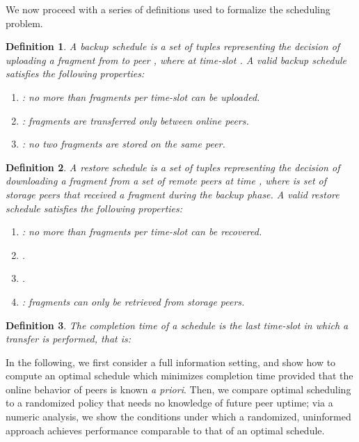 \documentclass[conference,10pt]{IEEEtran}
\newtheorem{definition}{Definition}
\begin{document}
We now proceed with a series of definitions used to formalize the
scheduling problem.

\begin{definition}
	A \emph{backup schedule} is a set of  tuples representing the decision of uploading a fragment from  to peer , where  at time-slot . A valid backup schedule  satisfies the following properties: 
	\begin{enumerate}
		\item : no more than  fragments per time-slot can be uploaded. 
		\item : fragments are transferred only between online peers. 
		\item : no two fragments are stored on the same peer. 
	\end{enumerate}
	
	\label{def:backup_schedule} 
\end{definition}

\begin{definition}
	A \emph{restore schedule} is a set of  tuples representing the decision of downloading a fragment from a set of remote peers  at time , where  is set of storage peers that received a fragment during the backup phase. A valid restore schedule  satisfies the following properties: 
	\begin{enumerate}
		\item : no more than  fragments per time-slot can be recovered. 
		\item . 
		\item . 
		\item : fragments can only be retrieved from storage peers. 
	\end{enumerate}
	
	\label{def:restore_schedule} 
\end{definition}

\begin{definition}
	
The \emph{completion time}  of a schedule  is the last time-slot
in which a transfer is performed, that is: 
\end{definition}

In the following, we first consider a full information setting, and
show how to compute an optimal schedule which minimizes completion
time provided that the online behavior of peers is known \emph{a
priori}. Then, we compare optimal scheduling to a randomized policy
that needs no knowledge of future peer uptime; via a numeric analysis,
we show the conditions under which a randomized, uninformed approach
achieves performance comparable to that of an optimal schedule.
\end{document}

